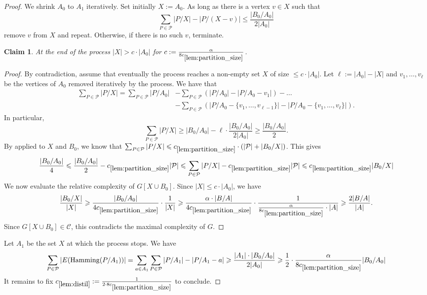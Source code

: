 \documentclass[11pt]{article}
\newtheorem{claim}[theorem]{Claim}
\theoremstyle{definition}
\newcommand{\CC}{{\mathscr C}}
\newcommand{\inducedSS}[2]{#1/#2}%
\renewcommand{\leq}{\leqslant}
\renewcommand{\le}{\leqslant}
\renewcommand{\geq}{\geqslant}
\renewcommand{\ge}{\geqslant}
\newcommand{\Pp}{\mathcal{P}}
\newcommand{\hamming}{\mathrm{Hamming}}
\begin{document}
\begin{proof}
We shrink $A_0$ to $A_1$ iteratively. Set initially $X := A_0$. As long as there is a vertex $v \in X$ such that 
\[
\sum_{P \in \Pp}|\inducedSS{P}{X}| - |\inducedSS{P}{(X - v)}| \leq \frac{|\inducedSS{B_0}{A_0}|}{2|A_0|}
\]
remove $v$ from $X$ and repeat. Otherwise, if there is no such $v$, terminate.

\begin{claim}
At the end of the process $|X| > c \cdot |A_0| $ for 
$c := \frac{\alpha}{8c_{\ref{lem:partition_size}}}$.
\end{claim}
\begin{proof}
By contradiction, assume that eventually the process reaches a non-empty set $X$ of size $\le c \cdot |A_0|$.
Let $\ell := |A_0| - |X|$ and $v_1, \dots, v_{\ell}$ be the vertices of $A_0$ removed iteratively by the process.
We have that
\begin{align*}
\sum_{P \in \Pp}|\inducedSS{P}{X}| =
\sum_{P \in \Pp}|\inducedSS{P}{A_0}|
&-\sum_{P \in \Pp}\left( |\inducedSS{P}{A_0}| - |\inducedSS{P}{A_0 - v_1}|\right) - \dots \\
  &- \sum_{P \in \Pp}\left( |\inducedSS{P}{A_0 - \{v_1, \dots, v_{\ell-1}\}}| - |\inducedSS{P}{A_0 - \{v_1, \dots, v_{\ell}\}}|\right).
\end{align*}
In particular, 
\[
\sum_{P \in \Pp}|\inducedSS{P}{X}| \ge
|B_0/A_0| - \ell \cdot \frac{|\inducedSS{B_0}{A_0}|}{2|A_0|} \geq
\frac{|\inducedSS{B_0}{A_0}|}{2}.
\]
By  applied to $X$ and $B_0$, we know that $\sum_{P \in \Pp}|\inducedSS{P}{X}| \leqslant c_{\ref{lem:partition_size}} \cdot (|\Pp| + |\inducedSS{B_0}{X}|)$.
This gives 
\[
\frac{|\inducedSS{B_0}{A_0}|}{4} \le
\frac{|\inducedSS{B_0}{A_0}|}{2} - c_{\ref{lem:partition_size}} |\Pp| \le
\sum_{P \in \Pp}|\inducedSS{P}{X}| - c_{\ref{lem:partition_size}} |\Pp|
\leqslant c_{\ref{lem:partition_size}} |\inducedSS{B_0}{X}|
\]
We now evaluate the relative complexity of $G[X \cup B_0]$. Since $|X| \le c \cdot |A_0|$, we have
\[
\frac{|\inducedSS{B_0}{X}|}{|X|} \ge
\frac{|\inducedSS{B_0}{A_0}|}{4c_{\ref{lem:partition_size}}} \cdot \frac{1}{|X|} \ge
\frac{\alpha \cdot |\inducedSS{B}{A}|}{4 c_{\ref{lem:partition_size}}} \cdot \frac{1}{\frac{\alpha}{8 c_{\ref{lem:partition_size}}} \cdot |A|} \geqslant \frac{2|\inducedSS{B}{A}|}{|A|}.
\]
Since $G[X \cup B_0] \in \CC$, this contradicts the maximal complexity of $G$.
\end{proof}
Let $A_1$ be the set $X$ at which the process stops.
We have
\[
\sum_{P \in \Pp} |E(\hamming(\inducedSS{P}{A_1}))| =
\sum_{a \in A_1} \sum_{P \in \Pp} |\inducedSS{P}{A_1}| - |\inducedSS{P}{A_1 - a}| \geqslant
\frac{|A_1| \cdot |\inducedSS{B_0}{A_0}|}{2|A_0|} \geqslant
\frac 12 \cdot \frac{\alpha}{8 c_{\ref{lem:partition_size}}}|\inducedSS{B_0}{A_0}|
\]
It remains to fix $c_{\ref{lem:distil}} := \frac{1}{2 \cdot 8c_{\ref{lem:partition_size}}}$ to conclude.
\end{proof}
\end{document}
